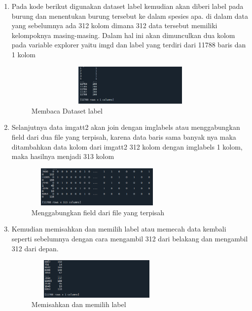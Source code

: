 \begin{enumerate}
    \item Pada kode berikut digunakan dataset label kemudian akan diberi label pada burung dan menentukan burung tersebut ke dalam spesies apa. di dalam data yang sebelumnya ada 312 kolom dimana 312 data tersebut memiliki kelompoknya masing-masing. Dalam hal ini akan dimunculkan dua kolom pada variable explorer yaitu imgd dan label yang terdiri dari 11788 baris dan 1 kolom
          \begin{figure}[!htbp]
              \centering
              \includegraphics[width=12cm,height=2cm]{figures/Cp3-7.png}
              \caption{Membaca Dataset label}
              \label{penanda}
          \end{figure}

    \item Selanjutnya data imgatt2 akan join dengan imglabels atau menggabungkan field dari dua file yang terpisah, karena data baris sama banyak nya maka ditambahkan data kolom dari imgatt2 312 kolom dengan imglabels 1 kolom, maka hasilnya menjadi 313 kolom
          \begin{figure}[!htbp]
              \centering
              \includegraphics[width=7cm,height=2cm]{figures/Cp3-8.png}
              \caption{Menggabungkan field dari file yang terpisah}
              \label{penanda}
          \end{figure}

    \item Kemudian memisahkan dan memilih label atau memecah data kembali seperti sebelumnya dengan cara mengambil 312 dari belakang dan mengambil 312 dari depan.
          \begin{figure}[!htbp]
              \centering
              \includegraphics[width=7cm,height=2cm]{figures/Cp3-9.png}
              \caption{Memisahkan dan memilih label}
              \label{penanda}
          \end{figure}


\end{enumerate}
